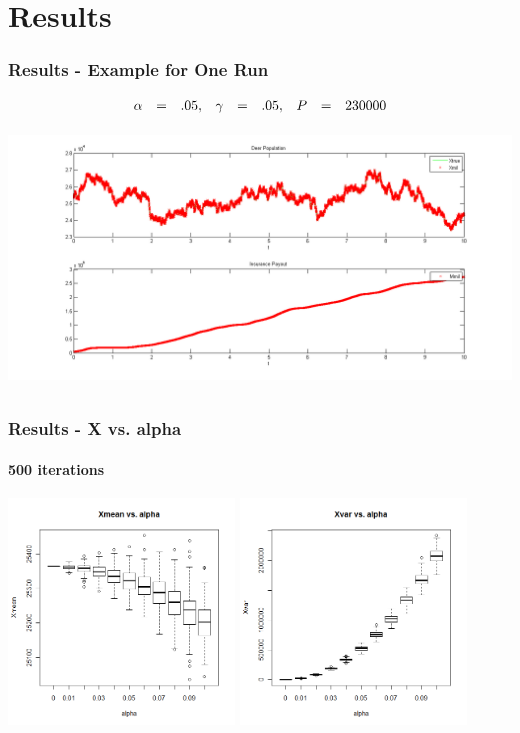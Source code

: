 



\section{Results}

\begin{frame}
    \frametitle{Results - Example for One Run}
\vspace*{-1cm}
\begin{eqnarray*}
\begin{array}{r c l r c l r c l}
	\alpha &=& .05, & \gamma &=& .05, & P &=& 230000
\end{array}
\end{eqnarray*}
\hspace*{-2cm}
\includegraphics[height=7cm]{deerins}
\end{frame}


\begin{frame}
    \frametitle{Results - X vs. alpha }
	\framesubtitle{500 iterations}
\hspace*{-5mm}
\includegraphics[height=6cm]{boxplot500_xmean_alpha}
\includegraphics[height=6cm]{boxplot500_xvar_alpha}
\end{frame}

